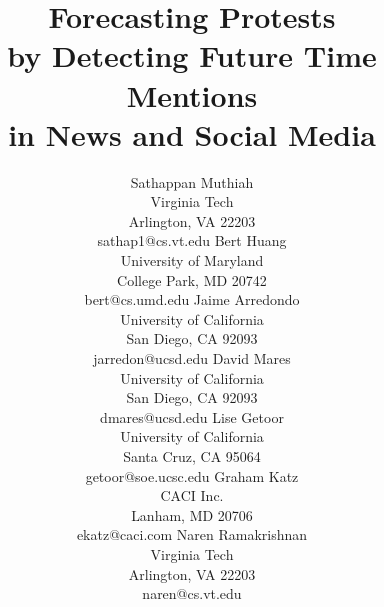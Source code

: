 \documentclass[letterpaper]{article}
\begin{document}
\newcommand{\narenc}[1]{[{\color{red} Naren writes: \it #1}]}
\newcommand{\sathappanc}[1]{[{\color{blue} Sathappan writes: \it #1}]}
\newcommand{\then}{\Rightarrow}
\newcommand{\softor}{\operatornamewithlimits{\tilde{\vee}}}
\newcommand{\softand}{\operatornamewithlimits{\tilde{\wedge}}}
\newcommand{\softthen}{\operatornamewithlimits{\tilde{\then}}}
\newcommand{\softneg}{\operatornamewithlimits{\tilde{\neg}}}
\title{Forecasting Protests \\by Detecting Future Time Mentions \\in News and Social Media}
\author{
Sathappan Muthiah\\
Virginia Tech\\
Arlington, VA 22203\\
sathap1@cs.vt.edu
\And
Bert Huang\\
       University of Maryland\\
       College Park, MD 20742\\
       bert@cs.umd.edu
       \And
Jaime Arredondo\\
       University of California\\
       San Diego, CA 92093\\
       jarredon@ucsd.edu
\AND 
David Mares\\
       University of California\\
       San Diego, CA 92093\\
       dmares@ucsd.edu
       \And
Lise Getoor\\
       University of California\\
       Santa Cruz, CA 95064\\
       getoor@soe.ucsc.edu
       \And
Graham Katz\\
       CACI Inc.\\
       Lanham, MD 20706\\
       ekatz@caci.com
       \And
Naren Ramakrishnan\\
       Virginia Tech\\
       Arlington, VA 22203\\
       naren@cs.vt.edu
}
\maketitle
\end{document}
